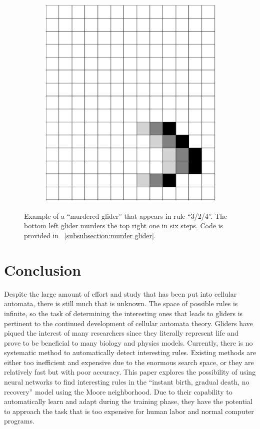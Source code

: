 \documentclass[12pt]{article}
\numberwithin{figure}{section} %
\begin{document}
\begin{figure}[H]
\begin{subfigure}{0.22\textwidth}
     		\subcaption{}
   	\end{subfigure}
	\begin{subfigure}{0.22\textwidth}
     		\includegraphics[width=\linewidth]{Section4/36.6}
     		\subcaption{}
   	\end{subfigure}
   \caption[Example of a "murdered glider"]{Example of a “murdered glider” that appears in rule “3/2/4”. The bottom left glider murders the top right one in six steps. Code is provided in ~\ref{subsubsection:murder glider}.}
   \label{fig:murder glider}
\end{figure}

\newpage
\section{Conclusion}
Despite the large amount of effort and study that has been put into cellular automata, there is still much that is unknown. The space of possible rules is infinite, so the task of determining the interesting ones that leads to gliders is pertinent to the continued development of cellular automata theory. Gliders have piqued the interest of many researchers since they literally represent life and prove to be beneficial to many biology and physics models. Currently, there is no systematic method to automatically detect interesting rules. Existing methods are either too inefficient and expensive due to the enormous search space, or they are relatively fast but with poor accuracy. This paper explores the possibility of using neural networks to find interesting rules in the “instant birth, gradual death, no recovery” model using the Moore neighborhood. Due to their capability to automatically learn and adapt during the training phase, they have the potential to approach the task that is too expensive for human labor and normal computer programs. 
\end{document}
